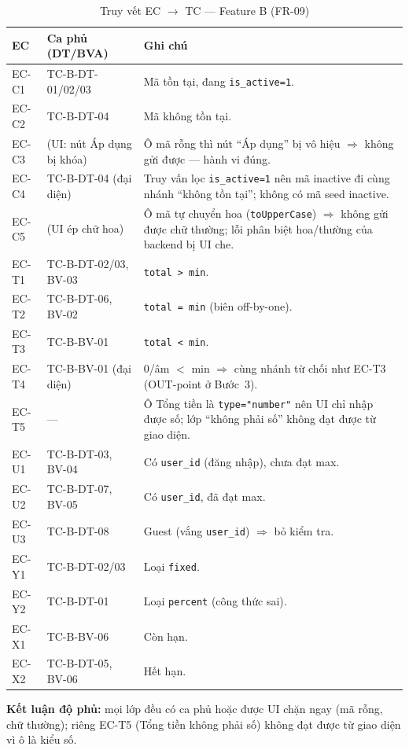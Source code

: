 \documentclass[12pt, a4paper]{report}
\begin{document}
\begin{table}[H]
    \centering
    \caption{Truy vết EC $\to$ TC — Feature B (FR-09)}
    \begin{tabularx}{\linewidth}{C{1.8cm} C{3.4cm} X}
        \toprule
        \textbf{EC} & \textbf{Ca phủ (DT/BVA)} & \textbf{Ghi chú} \\
        \midrule
        EC-C1 & TC-B-DT-01/02/03 & Mã tồn tại, đang \texttt{is\_active=1}. \\
        EC-C2 & TC-B-DT-04 & Mã không tồn tại. \\
        EC-C3 & (UI: nút Áp dụng bị khóa) & Ô mã rỗng thì nút ``Áp dụng'' bị vô hiệu $\Rightarrow$ không gửi được --- hành vi đúng. \\
        EC-C4 & TC-B-DT-04 (đại diện) & Truy vấn lọc \texttt{is\_active=1} nên mã inactive đi cùng nhánh ``không tồn tại''; không có mã seed inactive. \\
        EC-C5 & (UI ép chữ hoa) & Ô mã tự chuyển hoa (\texttt{toUpperCase}) $\Rightarrow$ không gửi được chữ thường; lỗi phân biệt hoa/thường của backend bị UI che. \\
        EC-T1 & TC-B-DT-02/03, BV-03 & \texttt{total > min}. \\
        EC-T2 & TC-B-DT-06, BV-02 & \texttt{total = min} (biên off-by-one). \\
        EC-T3 & TC-B-BV-01 & \texttt{total < min}. \\
        EC-T4 & TC-B-BV-01 (đại diện) & 0/âm $<$ min $\Rightarrow$ cùng nhánh từ chối như EC-T3 (OUT-point ở Bước~3). \\
        EC-T5 & --- & Ô Tổng tiền là \texttt{type="number"} nên UI chỉ nhập được số; lớp ``không phải số'' không đạt được từ giao diện. \\
        EC-U1 & TC-B-DT-03, BV-04 & Có \texttt{user\_id} (đăng nhập), chưa đạt max. \\
        EC-U2 & TC-B-DT-07, BV-05 & Có \texttt{user\_id}, đã đạt max. \\
        EC-U3 & TC-B-DT-08 & Guest (vắng \texttt{user\_id}) $\Rightarrow$ bỏ kiểm tra. \\
        EC-Y1 & TC-B-DT-02/03 & Loại \texttt{fixed}. \\
        EC-Y2 & TC-B-DT-01 & Loại \texttt{percent} (công thức sai). \\
        EC-X1 & TC-B-BV-06 & Còn hạn. \\
        EC-X2 & TC-B-DT-05, BV-06 & Hết hạn. \\
        \bottomrule
    \end{tabularx}
\end{table}
\noindent\textbf{Kết luận độ phủ:} mọi lớp đều có ca phủ hoặc được UI chặn ngay (mã rỗng, chữ
thường); riêng EC-T5 (Tổng tiền không phải số) không đạt được từ giao diện vì ô là kiểu số.
\end{document}
